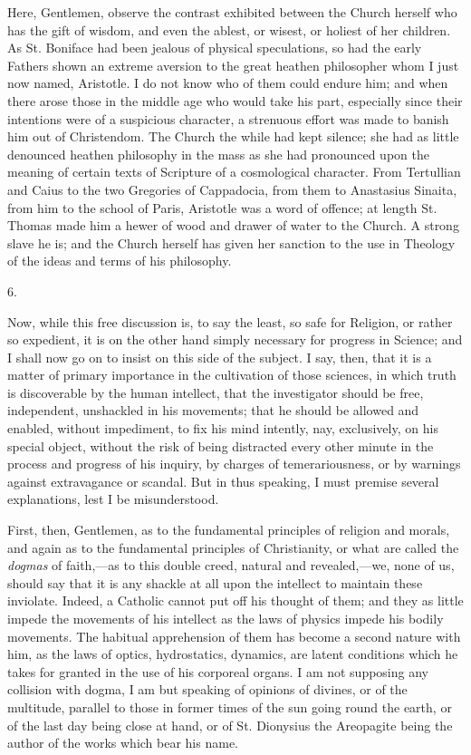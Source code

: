 Here, Gentlemen, observe the contrast exhibited between the Church
herself who has the gift of wisdom, and even the ablest, or wisest, or
holiest of her children. As St. Boniface had been jealous of physical
speculations, so had the early Fathers shown an extreme aversion to
the great heathen philosopher whom I just now named, Aristotle. I do
not know who of them could endure him; and when there arose those in
the middle age who would take his part, especially since their
intentions were of a suspicious character, a strenuous effort was made
to banish him out of Christendom. The Church the while had kept
silence; she had as little denounced heathen philosophy in the mass as
she had pronounced upon the meaning of certain texts of Scripture of a
cosmological character. From Tertullian and Caius to the two Gregories
of Cappadocia, from them to Anastasius Sinaita, from him to the school
of Paris, Aristotle was a word of offence; at length St. Thomas made
him a hewer of wood and drawer of water to the Church. A strong slave
he is; and the Church herself has given her sanction to the use in
Theology of the ideas and terms of his philosophy.

6.

Now, while this free discussion is, to say the least, so safe for
Religion, or rather so expedient, it is on the other hand simply
necessary for progress in Science; and I shall now go on to insist on
this side of the subject. I say, then, that it is a matter of primary
importance in the cultivation of those sciences, in which truth is
discoverable by the human intellect, that the investigator should be
free, independent, unshackled in his movements; that he should be
allowed and enabled, without impediment, to fix his mind intently,
nay, exclusively, on his special object, without the risk of being
distracted every other minute in the process and progress of his
inquiry, by charges of temerariousness, or by warnings against
extravagance or scandal. But in thus speaking, I must premise several
explanations, lest I be misunderstood.

First, then, Gentlemen, as to the fundamental principles of
religion and morals, and again as to the fundamental principles of
Christianity, or what are called the \emph{dogmas} of faith,—as to
this double creed, natural and revealed,—we, none of us, should say
that it is any shackle at all upon the intellect to maintain these
inviolate. Indeed, a Catholic cannot put off his thought of them; and
they as little impede the movements of his intellect as the laws of
physics impede his bodily movements. The habitual apprehension of them
has become a second nature with him, as the laws of optics,
hydrostatics, dynamics, are latent conditions which he takes for
granted in the use of his corporeal organs. I am not supposing any
collision with dogma, I am but speaking of opinions of divines, or of
the multitude, parallel to those in former times of the sun going
round the earth, or of the last day being close at hand, or of
St. Dionysius the Areopagite being the author of the works which bear
his name.

